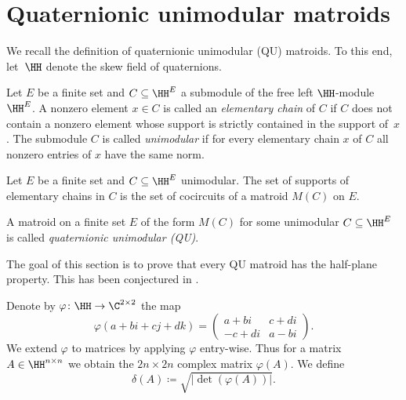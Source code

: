 \section{Quaternionic unimodular matroids}\label{sec:qu}
We recall the definition of quaternionic unimodular (QU) matroids. To this end, let~$\HH$ denote the skew field of quaternions.

\begin{Def}
    Let $E$ be a finite set and $C\subseteq\HH^E$ a submodule of the free left $\HH$-module $\HH^E$. A nonzero element $x\in C$ is called an \emph{elementary chain} of $C$ if $C$ does not contain a nonzero element whose support is strictly contained in the support of~$x$. The submodule $C$ is called \emph{unimodular} if for every elementary chain $x$ of $C$ all nonzero entries of $x$ have the same norm.
\end{Def}

\begin{thm}
    Let $E$ be a finite set and $C\subseteq\HH^E$ unimodular. The set of supports of elementary chains in $C$ is the set of cocircuits of a matroid $M(C)$ on $E$.
\end{thm}

\begin{Def}\label{def:qu}
    A matroid on a finite set $E$ of the form $M(C)$ for some unimodular $C\subseteq\HH^E$ is called \emph{quaternionic unimodular (QU)}.
\end{Def}

The goal of this section is to prove that every QU matroid has the half-plane property. This has been conjectured in \cite[Conjecture~6.9]{skewpartial}.


\begin{Def}
    Denote by $\varphi\colon\HH\to\C^{2\times 2}$ the map 
\begin{equation*}
    \varphi(a+bi+cj+dk)=
    \begin{pmatrix}
        a+bi& c+di\\
        -c+di& a-bi
    \end{pmatrix}.
\end{equation*}
    We extend $\varphi$ to matrices by applying $\varphi$ entry-wise. Thus for a matrix $A\in\HH^{n\times n}$ we obtain the $2n\times2n$ complex matrix $\varphi(A)$. We define
    \begin{equation*}
      \delta(A)\coloneqq \sqrt{|\det(\varphi(A))|}.  
    \end{equation*}
\end{Def}

